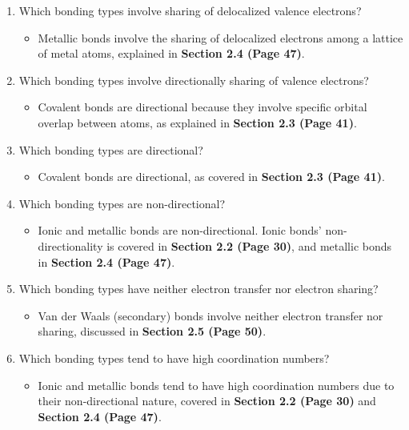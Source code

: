 \documentclass{article}
\begin{document}
\begin{enumerate}
	\item[(e)] Which bonding types involve sharing of delocalized valence electrons?
	      \begin{itemize}
	      	\item Metallic bonds involve the sharing of delocalized electrons among a lattice of metal atoms, explained in \textbf{Section 2.4 (Page 47)}.
	      \end{itemize}
	      
	\item[(f)] Which bonding types involve directionally sharing of valence electrons?
	      \begin{itemize}
	      	\item Covalent bonds are directional because they involve specific orbital overlap between atoms, as explained in \textbf{Section 2.3 (Page 41)}.
	      \end{itemize}
	      
	\item[(g)] Which bonding types are directional?
	      \begin{itemize}
	      	\item Covalent bonds are directional, as covered in \textbf{Section 2.3 (Page 41)}.
	      \end{itemize}
	      
	\item[(h)] Which bonding types are non-directional?
	      \begin{itemize}
	      	\item Ionic and metallic bonds are non-directional. Ionic bonds' non-directionality is covered in \textbf{Section 2.2 (Page 30)}, and metallic bonds in \textbf{Section 2.4 (Page 47)}.
	      \end{itemize}
	      
	\item[(i)] Which bonding types have neither electron transfer nor electron sharing?
	      \begin{itemize}
	      	\item Van der Waals (secondary) bonds involve neither electron transfer nor sharing, discussed in \textbf{Section 2.5 (Page 50)}.
	      \end{itemize}
	      
	\item[(j)] Which bonding types tend to have high coordination numbers?
	      \begin{itemize}
	      	\item Ionic and metallic bonds tend to have high coordination numbers due to their non-directional nature, covered in \textbf{Section 2.2 (Page 30)} and \textbf{Section 2.4 (Page 47)}.
	      \end{itemize}
	      
\end{enumerate}
\end{document}
